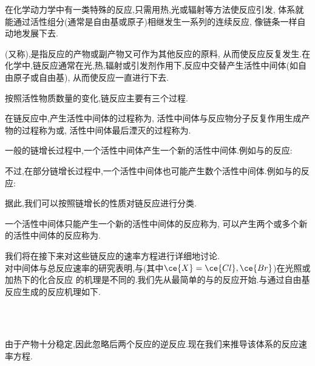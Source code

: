 \documentclass{ctexart}
\begin{document}
\pagestyle{plain}
\indent 在化学动力学中有一类特殊的反应,只需用热,光或辐射等方法使反应引发,%
体系就能通过活性组分(通常是自由基或原子)相继发生一系列的连续反应,%
像链条一样自动地发展下去.
\begin{definition}[7D.1.1 链反应]
    (又称),是指反应的产物或副产物又可作为其他反应的原料,%
    从而使反应反复发生.在化学中,链反应通常在光,热,辐射或引发剂作用下,反应中交替产生活性中间体(如自由原子或自由基),%
    从而使反应一直进行下去.
\end{definition}
按照活性物质数量的变化,链反应主要有三个过程.
\begin{definition}[7D.1.2 链反应的过程]
    在链反应中,产生活性中间体的过程称为,%
    活性中间体与反应物分子反复作用生成产物的过程称为或,%
    活性中间体最后湮灭的过程称为.
\end{definition}
一般的链增长过程中,一个活性中间体产生一个新的活性中间体.例如与的反应:
\begin{tightcenter}
\end{tightcenter}
不过,在部分链增长过程中,一个活性中间体也可能产生数个活性中间体.例如与的反应:
\begin{tightcenter}
\end{tightcenter}
据此,我们可以按照链增长的性质对链反应进行分类.
\begin{definition}[7D.1.3 直链反应与支链反应]
    一个活性中间体只能产生一个新的活性中间体的反应称为,%
    可以产生两个或多个新的活性中间体的反应称为.
\end{definition}
我们将在接下来对这些链反应的速率方程进行详细地讨论.\vspace{4pt}\\
\indent 对中间体与总反应速率的研究表明,与(其中$\ce{X}=\ce{Cl},\ce{Br}$)在光照或加热下的化合反应%
的机理是不同的.我们先从最简单的与的反应开始.与通过自由基反应生成的反应机理如下.
\begin{tightcenter}
    \\
    \\
\end{tightcenter}
由于产物十分稳定,因此忽略后两个反应的逆反应.现在我们来推导该体系的反应速率方程.
\end{document}
